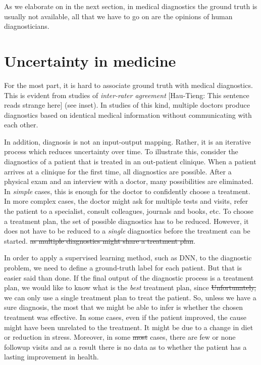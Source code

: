 \documentclass[11pt]{pnas-new}
\begin{document}
As we elaborate on in the next section, in medical diagnostics the
ground truth is usually not available, all that we have to go on are
the opinions of human diagnosticians.

\section{Uncertainty in medicine}

For the most part, it is hard to associate ground truth with medical
diagnostics. This is evident from studies of {\em inter-rater agreement} {\color{red}[Hau-Tieng: This sentence reads strange here]} (see
inset). In studies of this kind, multiple doctors produce diagnostics
based on identical medical information without communicating with each other. 



In addition, diagnosis is not an input-output mapping. Rather, it
is an iterative process which reduces uncertainty over time. To
illustrate this, consider the diagnostics of a patient that is treated
in an out-patient clinique.  When a patient arrives at a clinique for
the first time, all diagnostics are possible. After a physical exam
and an interview with a doctor, many possibilities are
eliminated. In {\em simple} cases, this is enough for the doctor to
confidently choose a treatment. In more complex cases, the doctor
might ask for multiple tests and visits, refer the patient to a
specialist, consult colleagues, journals and books, etc. To choose a
treatment plan, the set of possible diagnostics has to be reduced.
However, it does not have to be reduced to a {\em single} diagnostics {\color{red}before the treatment can be started.}
\sout{as multiple diagnostics might share a treatment plan}.

In order to apply a supervised learning method, such as  DNN, to the
diagnostic problem, we need to define a ground-truth label for each
patient. But that is easier said than done. If the final output of the
diagnostic process is a treatment plan, we would like to know what is
the {\em best} treatment plan, since \sout{Unfortunately,} we can only use a single
treatment plan to treat the patient. So, {\color{red}unless we have a sure diagnosis,} the most that we might be able
to infer is whether the chosen treatment was effective. {\color{red}In some cases,} even if the
patient improved, the cause might have been unrelated to the
treatment. It might be due to a change in diet or reduction in stress.
Moreover, in {\color{red}some} \sout{most} cases, there are few or none followup visits and as
a result there is no data as to whether the patient has a lasting
improvement in health.

\end{document}

